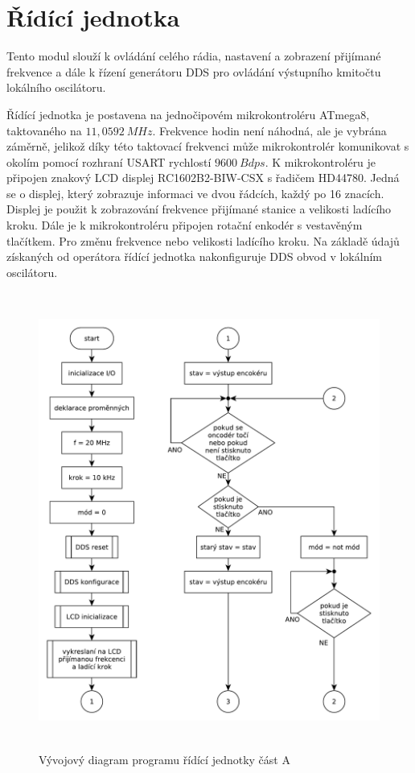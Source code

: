 \clearpage
\section{Řídící jednotka}
\indent\indent Tento modul slouží k ovládání celého rádia, nastavení a zobrazení přijímané frekvence a dále k řízení generátoru DDS pro ovládání výstupního kmitočtu lokálního oscilátoru.

Řídící jednotka je postavena na jednočipovém mikrokontroléru ATmega8, taktovaného na $11,0592~MHz$. Frekvence hodin není náhodná, ale je vybrána záměrně, jelikož díky této taktovací frekvenci může mikrokontrolér komunikovat s okolím pomocí rozhraní USART rychlostí $9600~Bdps$. K mikrokontroléru je připojen znakový LCD displej RC1602B2-BIW-CSX s řadičem HD44780. Jedná se o displej, který zobrazuje informaci ve dvou řádcích, každý po 16 znacích. Displej je použit k zobrazování frekvence přijímané stanice a velikosti ladícího kroku. Dále je k mikrokontroléru připojen rotační enkodér s vestavěným tlačítkem. Pro změnu frekvence nebo velikosti ladícího kroku. Na základě údajů získaných od operátora řídící jednotka nakonfiguruje DDS obvod v lokálním oscilátoru.


\begin{figure}[H]
	\centering
	\includegraphics[height=150mm]{img/vyvojak_a.pdf}
	\caption{Vývojový diagram programu řídící jednotky část A}    		
\end{figure}

